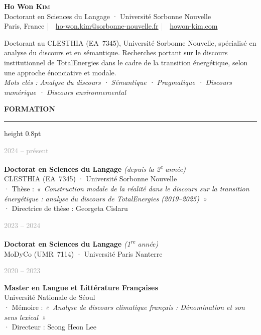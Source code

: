 \documentclass[10.5pt, a4paper]{article}
\newlength{\datecol}
\newlength{\contentcol}
\newcommand{\cvrow}[2]{%
  \noindent
  \parbox[t]{\datecol}{\raggedleft\textcolor{darkgray}{\small #1}}%
  \hspace{1.2em}%
  \parbox[t]{\contentcol}{\sloppy\hbadness=10000 #2}%
  \par\vspace{0.6em}%
}
\newcommand{\cvsection}[1]{%
  \vspace{10pt}%
  {\color{navy}\large\bfseries\MakeUppercase{#1}}%
  \vspace{2pt}%
  {\color{navy}\hrule height 0.8pt}%
  \vspace{6pt}%
}
\begin{document}

\begin{center}
  {\huge\bfseries\color{navy} Ho Won \textsc{Kim}}\\[10pt]
  {\large Doctorant en Sciences du Langage · Université Sorbonne Nouvelle}\\[6pt]
  {\small
    Paris, France
    \quad\textcolor{lightgray}{|}\ \
    \href{mailto:ho-won.kim@sorbonne-nouvelle.fr}{ho-won.kim@sorbonne-nouvelle.fr}
    \quad\textcolor{lightgray}{|}\ \
    \href{https://howon-kim.com}{howon-kim.com}
  }
\end{center}

\vspace{8pt}

{Doctorant au CLESTHIA (EA~7345), Université Sorbonne Nouvelle, spécialisé en analyse du
discours et en sémantique. Recherches portant sur le discours institutionnel de TotalEnergies dans le cadre de la transition énergétique, selon une approche énonciative et modale.}
\vspace{4pt}
\\
{\small\itshape\color{darkgray}
Mots clés : Analyse du discours  ·  Sémantique  ·  Pragmatique  ·  Discours numérique  ·  Discours environnemental}
\vspace{6pt}


\cvsection{Formation}

\cvrow{2024 -- présent}{%
  \textbf{Doctorat en Sciences du Langage}
  \textit{(depuis la 2\textsuperscript{e} année)}\\
  CLESTHIA (EA~7345) · Université Sorbonne Nouvelle\\
  {\small   · Thèse : \textit{«~Construction modale de la réalité dans le discours sur la
  transition énergétique : analyse du discours de TotalEnergies (2019--2025)~»}\\
    · Directrice de thèse : Georgeta Cislaru}}

\cvrow{2023 -- 2024}{%
  \textbf{Doctorat en Sciences du Langage}
  \textit{(1\textsuperscript{re} année)}\\
  MoDyCo (UMR~7114) · Université Paris Nanterre}

\cvrow{2020 -- 2023}{%
  \textbf{Master en Langue et Littérature Françaises}\\
  Université Nationale de Séoul\\
  {\small   · Mémoire : \textit{«~Analyse de discours climatique français :
  Dénomination et son sens lexical~»}
\\
   ·  Directeur : Seong Heon Lee}}
\end{document}
